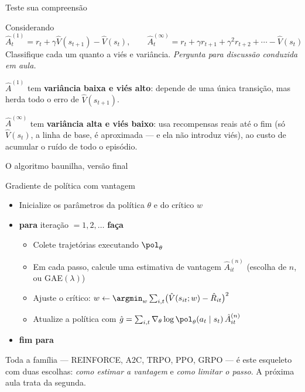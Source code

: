 \documentclass[aspectratio=169, 11pt]{beamer}
\newcommand{\paradiscussao}{\smallskip
  {\footnotesize\color{rlCinza}\itshape Pergunta para discussão conduzida em aula.}}
\newcommand{\thv}{\theta}                       %
\newcommand{\wv}{w}                             %
\newcommand{\polth}{\pol_{\thv}}                %
\newcommand{\gth}{\nabla_{\thv}}                %
\newcommand{\Vhat}{\hat{V}}
\newcommand{\Ahat}{\hat{A}}
\begin{document}
\begin{frame}{Teste sua compreensão}

  \begin{quizbox}{}
    Considerando
    \[
      \Ahat^{(1)}_t = r_t + \gamma \Vhat(s_{t+1}) - \Vhat(s_t),
      \qquad
      \Ahat^{(\infty)}_t = r_t + \gamma r_{t+1} + \gamma^2 r_{t+2} + \cdots - \Vhat(s_t)
    \]
    Classifique cada um quanto a viés e variância.
    \paradiscussao
  \end{quizbox}

  \pause

  \begin{respbox}
    $\Ahat^{(1)}$ tem \textbf{variância baixa e viés alto}: depende de uma
    única transição, mas herda todo o erro de $\Vhat(s_{t+1})$.

    \smallskip
    $\Ahat^{(\infty)}$ tem \textbf{variância alta e viés baixo}: usa
    recompensas reais até o fim (só $\Vhat(s_t)$, a linha de base, é
    aproximada --- e ela não introduz viés), ao custo de acumular o ruído de
    todo o episódio.
  \end{respbox}
\end{frame}

\begin{frame}{O algoritmo baunilha, versão final}

  \begin{algbox}{Gradiente de política com vantagem}
    {\footnotesize
    \begin{itemize}\setlength{\itemsep}{0.15ex}
      \item Inicialize os parâmetros da política $\thv$ e do crítico $\wv$
      \item \textbf{para} iteração $=1,2,\dots$ \textbf{faça}
        \begin{itemize}\setlength{\itemsep}{0.1ex}
          \item Colete trajetórias executando $\polth$
          \item Em cada passo, calcule uma estimativa de vantagem
            $\Ahat^{(n)}_{it}$ (escolha de $n$, ou GAE$(\lambda)$)
          \item Ajuste o crítico: $\wv \leftarrow \argmin_{\wv}
            \sum_{i,t}\bigl(\Vhat(s_{it};\wv) - \hat{R}_{it}\bigr)^2$
          \item Atualize a política com
            $\hat{g} = \sum_{i,t}\gth \log \polth(a_t\mid s_t)\,\Ahat^{(n)}_{it}$
        \end{itemize}
      \item \textbf{fim para}
    \end{itemize}}
  \end{algbox}

  \begin{ideiabox}
    Toda a família --- REINFORCE, A2C, TRPO, PPO, GRPO --- é este esqueleto
    com duas escolhas: \emph{como estimar a vantagem} e \emph{como limitar o
    passo}. A próxima aula trata da segunda.
  \end{ideiabox}
\end{frame}
\end{document}
